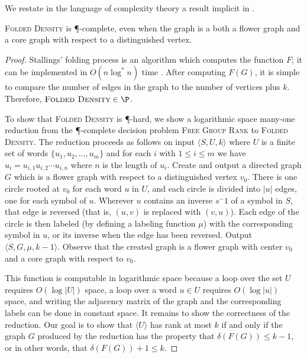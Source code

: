 \documentclass{article}
\newcommand{\FGR}{\textsc{Free Group Rank}}
\newcommand{\FD}{\textsc{Folded Density}}
\newcommand{\gen}[1]{\langle #1 \rangle}
\begin{document}
We restate in the language of complexity theory a result implicit in \cite{km02}.
\begin{theorem}\label{thm:fdpcomplete}
  \FD{} is \P-complete, even when the graph is a both a flower graph and a core graph with respect to a distinguished vertex.
\end{theorem}
\begin{proof}
  Stallings' folding process \cite[Algorithm~5.4]{stallings83} is an algorithm which computes the function $F$; it can be implemented in $O(n \log^* n)$ time \cite{touikan06}.
  After computing $F(G)$, it is simple to compare the number of edges in the graph to the number of vertices plus $k$.
  Therefore, $\FD \in \P$.

  To show that \FD{} is \P-hard, we show a logarithmic space many-one reduction from the \P-complete decision problem \FGR{} to \FD.
  The reduction proceeds as follows on input $\langle S, U, k \rangle$ where $U$ is a finite set of words $\{u_1, u_2, \dotsc, u_m\}$ and for each $i$ with $1 \leq i \leq m$ we have $u_i = u_{i, 1}u_{i, 2}\dotsb u_{i, n}$ where $n$ is the length of $u_i$.
  Create and output a directed graph $G$ which is a flower graph with respect to a distinguished vertex $v_0$.
  There is one circle rooted at $v_0$ for each word $u$ in $U$, and each circle is divided into $|u|$ edges, one for each symbol of $u$.
  Wherever $u$ contains an inverse $s^-1$ of a symbol in $S$, that edge is reversed (that is, $(u, v)$ is replaced with $(v, u)$).
  Each edge of the circle is then labeled (by defining a labeling function $\mu$) with the corresponding symbol in $u$, or its inverse when the edge has been reversed.
  Output $\langle S, G, \mu, k - 1 \rangle$.
  Observe that the created graph is a flower graph with center $v_0$ and a core graph with respect to $v_0$.

  This function is computable in logarithmic space because a loop over the set $U$ requires $O(\log |U|)$ space, a loop over a word $u \in U$ requires $O(\log |u|)$ space, and writing the adjacency matrix of the graph and the corresponding labels can be done in constant space.
  It remains to show the correctness of the reduction.
  Our goal is to show that $\gen{U}$ has rank at most $k$ if and only if the graph $G$ produced by the reduction has the property that $\delta(F(G)) \leq k - 1$, or in other words, that $\delta(F(G)) + 1 \leq k$.


\end{proof}
\end{document}
